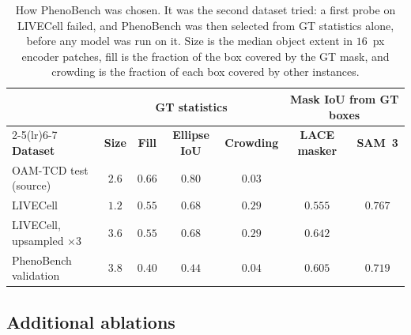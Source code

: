 \documentclass[remotesensing,article,submit,moreauthors]{Definitions/mdpi}
\begin{document}
\begin{table}[H]
\caption{How PhenoBench was chosen. It was the second dataset tried: a first probe on LIVECell failed, and PhenoBench was then selected from GT statistics alone, before any model was run on it. Size is the median object extent in $16$~px encoder patches, fill is the fraction of the box covered by the GT mask, and crowding is the fraction of each box covered by other instances. \label{tab:phenobench-choice}}
\small\setlength{\tabcolsep}{4pt}
\begin{tabularx}{\textwidth}{Xcccccc}
\toprule
& \multicolumn{4}{c}{\textbf{GT statistics}} & \multicolumn{2}{c}{\textbf{Mask IoU from GT boxes}} \\
\cmidrule(lr){2-5}\cmidrule(lr){6-7}
\textbf{Dataset} & \textbf{Size} & \textbf{Fill} & \textbf{Ellipse IoU} & \textbf{Crowding} & \textbf{LACE masker} & \textbf{SAM~3} \\
\midrule
OAM-TCD test (source) & $2.6$ & $0.66$ & $0.80$ & $0.03$ & & \\
LIVECell & $1.2$ & $0.55$ & $0.68$ & $0.29$ & $0.555$ & $0.767$ \\
LIVECell, upsampled $\times 3$ & $3.6$ & $0.55$ & $0.68$ & $0.29$ & $0.642$ & \\
PhenoBench validation & $3.8$ & $0.40$ & $0.44$ & $0.04$ & $0.605$ & $0.719$ \\
\bottomrule
\end{tabularx}
\end{table}

\subsection{Additional ablations}
\label{app:ablations}
\end{document}
